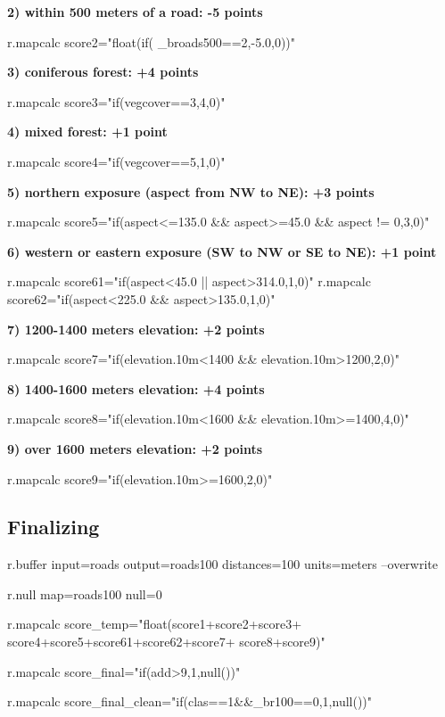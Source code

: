 \textbf{
2) within 500 meters of a road: -5 points}
\begin{smallverbatim}
r.mapcalc score2="float(if(
 _broads500==2,-5.0,0))"
\end{smallverbatim}

\textbf{
3) coniferous forest: +4 points}
\begin{smallverbatim}
r.mapcalc score3="if(vegcover==3,4,0)"
\end{smallverbatim}

\textbf{
4) mixed forest: +1 point}
\begin{smallverbatim}
r.mapcalc score4="if(vegcover==5,1,0)"
\end{smallverbatim}

\textbf{
5) northern exposure (aspect from NW to NE): +3 points}
\begin{smallverbatim}
r.mapcalc score5="if(aspect<=135.0 && aspect>=45.0
 && aspect != 0,3,0)"
\end{smallverbatim}

\textbf{
6) western or eastern exposure (SW to NW or SE to NE): +1 point}
\begin{smallverbatim}
r.mapcalc score61="if(aspect<45.0 || aspect>314.0,1,0)"
r.mapcalc score62="if(aspect<225.0 && aspect>135.0,1,0)"
\end{smallverbatim}

\textbf{
7) 1200-1400 meters elevation: +2 points}
\begin{smallverbatim}
r.mapcalc score7="if(elevation.10m<1400
 && elevation.10m>1200,2,0)"
\end{smallverbatim}

\textbf{
8) 1400-1600 meters elevation: +4 points}
\begin{smallverbatim}
r.mapcalc score8="if(elevation.10m<1600
 && elevation.10m>=1400,4,0)"
\end{smallverbatim}

\textbf{
9) over 1600 meters elevation: +2 points}
\begin{smallverbatim}
r.mapcalc score9="if(elevation.10m>=1600,2,0)"
\end{smallverbatim}

\subsection{Finalizing}

\begin{smallverbatim}
r.buffer input=roads output=roads100
 distances=100 units=meters --overwrite

r.null map=roads100 null=0

r.mapcalc score_temp="float(score1+score2+score3+
 score4+score5+score61+score62+score7+
score8+score9)"

r.mapcalc score_final="if(add>9,1,null())"

r.mapcalc score_final_clean="if(clas==1&&_br100==0,1,null())"
\end{smallverbatim}

